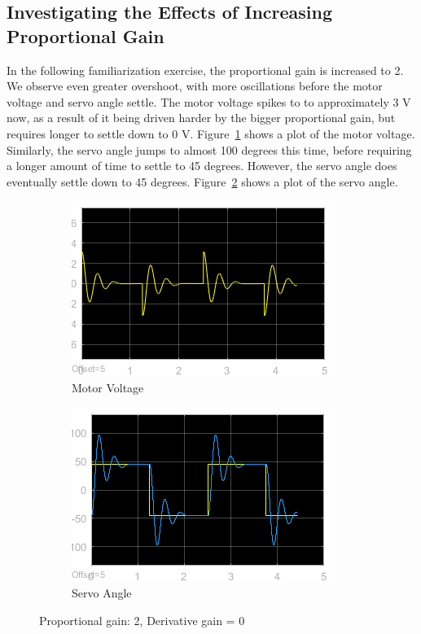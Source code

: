 \documentclass[12pt]{article}
\begin{document}
\subsection*{Investigating the Effects of Increasing Proportional Gain} %
In the following familiarization exercise, the proportional gain is increased to 2. We observe even greater overshoot, with more oscillations before the motor voltage and servo angle settle. The motor voltage spikes to to approximately 3 V now, as a result of it being driven harder by the bigger proportional gain, but requires longer to settle down to 0 V. Figure~\ref{fig:ix_volt} shows a plot of the motor voltage. Similarly, the servo angle jumps to almost 100 degrees this time, before requiring a longer amount of time to settle to 45 degrees. However, the servo angle does eventually settle down to 45 degrees. Figure~\ref{fig:ix_angle} shows a plot of the servo angle.
\begin{figure}[h!]
    \centering
    \begin{subfigure}[b]{0.49\textwidth}
        \includegraphics[width=\textwidth]{ix_voltage}
        \caption{\label{fig:ix_volt}Motor Voltage}
    \end{subfigure}
    \begin{subfigure}[b]{0.49\textwidth}
        \includegraphics[width=\textwidth]{ix_angle}
        \caption{\label{fig:ix_angle}Servo Angle}
    \end{subfigure}
    \caption{\label{fig:ix} Proportional gain: 2, Derivative gain = 0}
\end{figure}
\end{document}
